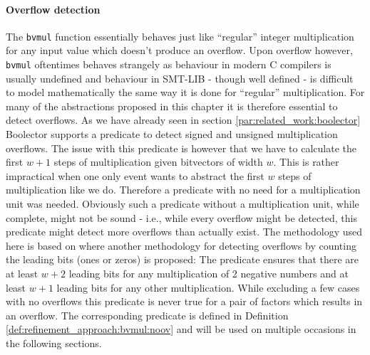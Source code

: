 \paragraph{Overflow detection}
The \texttt{bvmul} function essentially behaves just like \enquote{regular} integer multiplication for any input value
which doesn't produce an overflow.
Upon overflow however, \texttt{bvmul} oftentimes behaves strangely as behaviour in modern C compilers is usually undefined
and behaviour in SMT-LIB - though well defined - is difficult to model mathematically the same way it is done for \enquote{regular} multiplication.
For many of the abstractions proposed in this chapter it is therefore essential to detect overflows.
As we have already seen in section \ref{par:related_work:boolector} Boolector supports a predicate to detect signed and unsigned multiplication overflows.
The issue with this predicate is however that we have to calculate the first $w+1$ steps of multiplication given bitvectors of width $w$.
This is rather impractical when one only event wants to abstract the first $w$ steps of multiplication like we do.
Therefore a predicate with no need for a multiplication unit was needed.
Obviously such a predicate without a multiplication unit, while complete, might not be sound - i.e., while every overflow might be detected,
this predicate might detect more overflows than actually exist.
The methodology used here is based on \cite{Warren-HackersDelight} where another methodology for detecting overflows by counting the leading bits (ones or zeros)
is proposed:
The predicate ensures that there are at least $w+2$ leading bits for any multiplication of 2 negative numbers and at least $w+1$ leading bits for any other multiplication.
While excluding a few cases with no overflows this predicate is never true for a pair of factors which results in an overflow.
The corresponding predicate is defined in Definition \ref{def:refinement_approach:bvmul:noov} and will be used on multiple occasions in the following sections.
